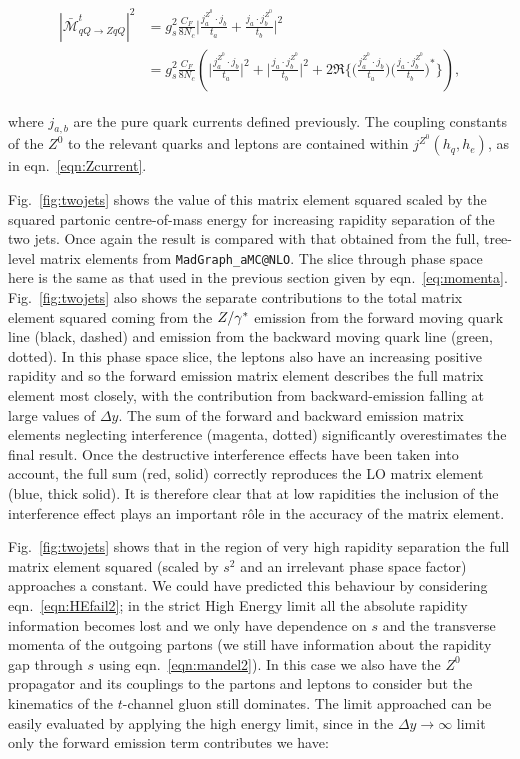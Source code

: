 		\begin{align}
		\begin{split}
			{|\bar{\mathcal{M}}_{qQ\to ZqQ}^{t}|}^2 &= g_s^2 \frac{C_F}{8N_c}
			\Big|\frac{j^{Z^0}_a\cdot j_b}{t_a} + \frac{j_a\cdot
			j^{Z^0}_b}{t_b}\Big|^2\\
			&= g_s^2 \frac{C_F}{8N_c} \left( \Big|\frac{j^{Z^0}_a\cdot j_b}{t_a}\Big|^2 + \Big|\frac{j_a\cdot
			j^{Z^0}_b}{t_b}\Big|^2 + 2\Re{\Big\{\Big(\frac{j^{Z^0}_a\cdot
			j_b}{t_a}\Big)\Big(\frac{j_a\cdot j^{Z^0}_b}{t_b}\Big)^*\Big\}} \right),
			\label{eqn:interference}
		\end{split}
		\end{align}

		where $j_{a,b}$ are the pure quark currents defined previously.  The
		coupling constants of the $Z^0$ to the relevant quarks and leptons are contained
		within $j^{Z^0}(h_q,h_e)$, as in eqn.~\eqref{eqn:Zcurrent}.

		Fig.~\eqref{fig:twojets} shows the value of this matrix element squared scaled by the squared partonic
		centre-of-mass energy for increasing rapidity separation of the two jets. Once again the
		result is compared with that obtained from the full, tree-level matrix elements from
		\texttt{MadGraph\_aMC@NLO}.  The slice through phase space here is the same as that used in the
		previous section given by eqn.~\eqref{eq:momenta}.  Fig.~\eqref{fig:twojets} also
		shows the separate contributions to the total matrix element squared coming from the
		$Z/\gamma^*$ emission from the forward moving quark line (black, dashed) and emission
		from the backward moving quark line (green, dotted).  In this phase space slice,
		the leptons also have an increasing positive rapidity and so the forward emission
		matrix element describes the full matrix element most closely, with the contribution
		from backward-emission falling at large values of $\Delta y$.  The sum of the forward
		and backward emission matrix elements neglecting interference (magenta, dotted)
		significantly overestimates the final result.  Once the destructive interference
		effects have been taken into account, the full sum (red, solid) correctly reproduces
		the LO matrix element (blue, thick solid).  It is therefore clear that at low
		rapidities the inclusion of the interference effect plays an important r\^ole in
		the accuracy of the matrix element.

		Fig.~\eqref{fig:twojets} shows that in the region of very high rapidity separation
		the full matrix element squared (scaled by $s^2$ and an irrelevant phase space factor)
		approaches a constant.  We could have predicted this behaviour by considering
		eqn.~\eqref{eqn:HEfail2}; in the strict High Energy limit all the absolute rapidity
		information becomes lost and we only have dependence on $s$ and the transverse
		momenta of the outgoing partons (we still have information about the rapidity gap through
		$s$ using eqn.~\eqref{eqn:mandel2}).  In this case we also have the $Z^0$ propagator
		and its couplings to the partons and leptons to consider but the kinematics of the
		$t$-channel gluon still dominates.  The limit approached can be easily evaluated
		by applying the high energy limit, since in the $\Delta y\to\infty$ limit only
		the forward emission term contributes we have:

